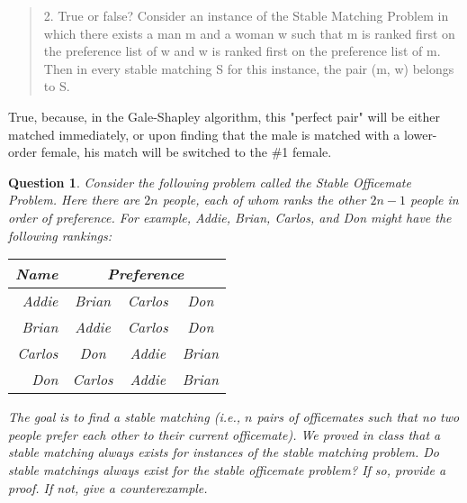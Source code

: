 \documentclass[11pt]{article}
\newtheorem{question}{Question}
\begin{document}
\begin{quotation}
2.
True or false? Consider an instance of the Stable Matching Problem in which there exists a man m and a woman w such that m is ranked first on the preference list of w and w is ranked first on the preference list of m. Then in every stable matching S for this instance, the pair (m, w) belongs to S.
\end{quotation}

\begin{large}
True, because, in the Gale-Shapley algorithm, this "perfect pair" will be either matched immediately, or upon finding that the male is matched with a lower-order female, his match will be switched to the \#1 female.
\end{large}
\pagebreak 

\begin{question}
Consider the following problem called the {\em Stable Officemate Problem}.  Here there are $2n$ people, each of whom ranks the other $2n-1$ people in order of preference.  For example, Addie, Brian, Carlos, and Don might have the following rankings:

\begin{table}[h]
\begin{center}
\begin{tabular}{r|ccc}
Name & \multicolumn{3}{c}{Preference}\\
\hline
Addie & Brian & Carlos & Don\\
Brian & Addie & Carlos & Don \\
Carlos & Don & Addie & Brian \\
Don & Carlos & Addie & Brian
\end{tabular}
\end{center}
\end{table}

The goal is to find a stable matching ({\em i.e.,} $n$ pairs of officemates such that no two people prefer each other to their current officemate).  We proved in class that a stable matching always exists for instances of the stable matching problem.  Do stable matchings always exist for the stable officemate problem?  If so, provide a proof.  If not, give a counterexample.
\end{question}
\pagebreak 
\end{document}
